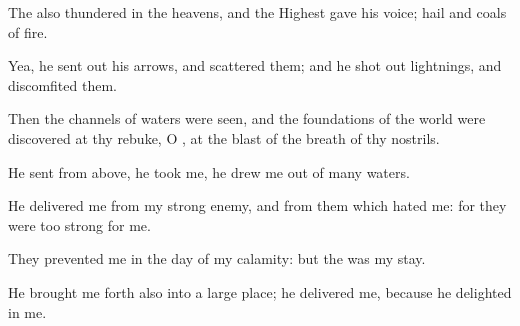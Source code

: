 {\par }{\Q {}The
{} also
thundered in the
heavens, and the
Highest
gave his
voice;
hail
{} and
coals of
fire.


\par }{\Q {}Yea, he sent
out his
arrows, and
scattered them; and he shot
out
lightnings, and
discomfited them.


\par }{\Q {}Then the
channels of
waters were
seen, and the
foundations of the
world were
discovered at thy
rebuke, O
{}, at the
blast of the
breath of thy
nostrils.


\par }{\Q {}He
sent from
above, he
took me, he
drew me out of
many
waters.


\par }{\Q {}He
delivered me from my
strong
enemy, and from them which
hated me: for they were too
strong for me.


\par }{\Q {}They
prevented me in the
day of my
calamity: but the
{} was my
stay.


\par }{\Q {}He brought me
forth also into a large
place; he
delivered me, because he
delighted in me.


\par }{\BB \par }
